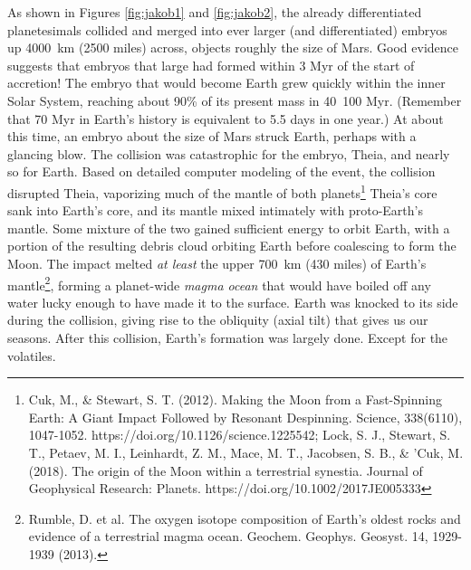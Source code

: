 As shown in Figures \ref{fig:jakob1} and \ref{fig:jakob2}, the already differentiated planetesimals collided and merged into ever larger (and differentiated) embryos up \SI{4000}{\kilo\metre} (2500 miles) across, objects roughly the size of Mars. Good evidence suggests that embryos that large had formed within 3 Myr of the start of accretion! The embryo that would become Earth grew quickly within the inner Solar System, reaching about 90\% of its present mass in \SI{40}{100}{} Myr. (Remember that 70 Myr in Earth's history is equivalent to 5.5 days in one year.) At about this time, an embryo about the size of Mars struck Earth, perhaps with a glancing blow. The collision was catastrophic for the embryo, Theia, and nearly so for Earth. Based on detailed computer modeling of the event, the collision disrupted Theia, vaporizing much of the mantle of both planets\footnote{Cuk, M., \& Stewart, S. T. (2012). Making the Moon from a Fast-Spinning Earth: A Giant Impact Followed by Resonant Despinning. Science, 338(6110), 1047-1052. https://doi.org/10.1126/science.1225542; Lock, S. J., Stewart, S. T., Petaev, M. I., Leinhardt, Z. M., Mace, M. T., Jacobsen, S. B., \& 'Cuk, M. (2018). The origin of the Moon within a terrestrial synestia. Journal of Geophysical Research: Planets. https://doi.org/10.1002/2017JE005333
} Theia's core sank into Earth's core, and its mantle mixed intimately with proto-Earth's mantle. Some mixture of the two gained sufficient energy to orbit Earth, with a portion of the resulting debris cloud orbiting Earth before coalescing to form the Moon. The impact melted \textit{at least} the upper \SI{700}{\kilo\metre} (430 miles) of Earth's mantle\footnote{Rumble, D. et al. The oxygen isotope composition of Earth's oldest rocks and evidence of a terrestrial magma ocean. Geochem. Geophys. Geosyst. 14, 1929-1939 (2013).}, forming a planet-wide \emph{magma ocean} that would have boiled off any water lucky enough to have made it to the surface. Earth was knocked to its side during the collision, giving rise to the obliquity (axial tilt) that gives us our seasons. After this collision, Earth's formation was largely done. Except for the volatiles.\\

